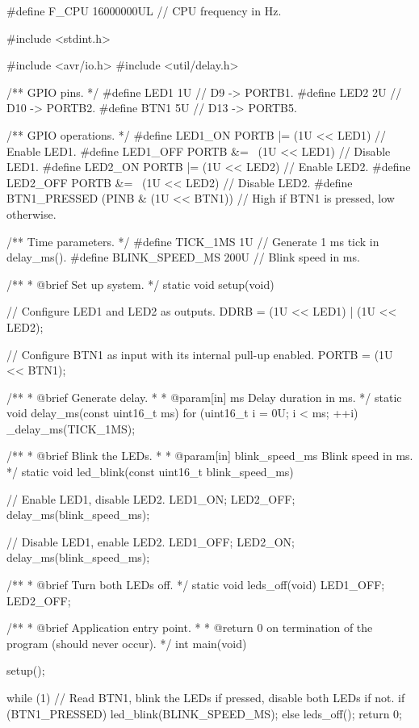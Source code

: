 \begin{ccode}
#define F_CPU 16000000UL // CPU frequency in Hz.

#include <stdint.h>

#include <avr/io.h>
#include <util/delay.h>

/** GPIO pins. */
#define LED1 1U // D9  -> PORTB1.
#define LED2 2U // D10 -> PORTB2.
#define BTN1 5U // D13 -> PORTB5.

/** GPIO operations. */
#define LED1_ON PORTB |= (1U << LED1)      // Enable LED1.
#define LED1_OFF PORTB &= ~(1U << LED1)    // Disable LED1.
#define LED2_ON PORTB |= (1U << LED2)      // Enable LED2.
#define LED2_OFF PORTB &= ~(1U << LED2)    // Disable LED2.
#define BTN1_PRESSED (PINB & (1U << BTN1)) // High if BTN1 is pressed, low otherwise.

/** Time parameters. */
#define TICK_1MS 1U         // Generate 1 ms tick in delay_ms().
#define BLINK_SPEED_MS 200U // Blink speed in ms.

/**
 * @brief Set up system.
 */
static void setup(void)
{
    // Configure LED1 and LED2 as outputs.
    DDRB = (1U << LED1) | (1U << LED2);

    // Configure BTN1 as input with its internal pull-up enabled.
    PORTB = (1U << BTN1);
}

/**
 * @brief Generate delay.
 *
 * @param[in] ms Delay duration in ms.
 */
static void delay_ms(const uint16_t ms)
{
    for (uint16_t i = 0U; i < ms; ++i)
    {
        _delay_ms(TICK_1MS);
    }
}

/**
 * @brief Blink the LEDs.
 *
 * @param[in] blink_speed_ms Blink speed in ms.
 */
static void led_blink(const uint16_t blink_speed_ms)
{
    // Enable LED1, disable LED2.
    LED1_ON;
    LED2_OFF;
    delay_ms(blink_speed_ms);

    // Disable LED1, enable LED2.
    LED1_OFF;
    LED2_ON;
    delay_ms(blink_speed_ms);
}

/**
 * @brief Turn both LEDs off.
 */
static void leds_off(void)
{
    LED1_OFF;
    LED2_OFF;
}

/**
 * @brief Application entry point.
 *
 * @return 0 on termination of the program (should never occur).
 */
int main(void)
{
    setup();

    while (1)
    {
        // Read BTN1, blink the LEDs if pressed, disable both LEDs if not.
        if (BTN1_PRESSED) { led_blink(BLINK_SPEED_MS); }
        else { leds_off(); }
    }
    return 0;
}
\end{ccode}

